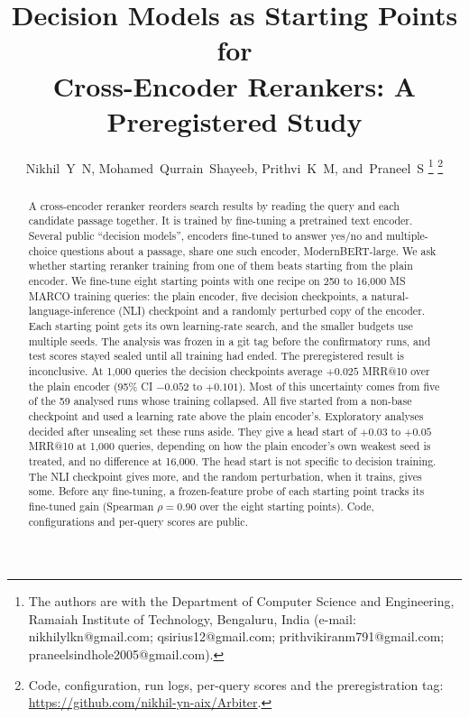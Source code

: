 \documentclass[journal]{IEEEtran}
\makeatletter
\newcommand{\ms}{MRR@10}
\makeatother
\begin{document}
\title{Decision Models as Starting Points for\\Cross-Encoder Rerankers: A Preregistered Study}

\author{Nikhil~Y~N, Mohamed~Qurrain~Shayeeb, Prithvi~K~M, and~Praneel~S%
\thanks{The authors are with the Department of Computer Science and Engineering, Ramaiah Institute of Technology, Bengaluru, India (e-mail: nikhilylkn@gmail.com; qsirius12@gmail.com; prithvikiranm791@gmail.com; praneelsindhole2005@gmail.com).}%
\thanks{Code, configuration, run logs, per-query scores and the preregistration tag: \url{https://github.com/nikhil-yn-aix/Arbiter}.}}


\maketitle

\begin{abstract}
A cross-encoder reranker reorders search results by reading the query and each candidate passage together. It is trained by fine-tuning a pretrained text encoder. Several public ``decision models'', encoders fine-tuned to answer yes/no and multiple-choice questions about a passage, share one such encoder, ModernBERT-large. We ask whether starting reranker training from one of them beats starting from the plain encoder. We fine-tune eight starting points with one recipe on 250 to 16{,}000 MS MARCO training queries: the plain encoder, five decision checkpoints, a natural-language-inference (NLI) checkpoint and a randomly perturbed copy of the encoder. Each starting point gets its own learning-rate search, and the smaller budgets use multiple seeds. The analysis was frozen in a git tag before the confirmatory runs, and test scores stayed sealed until all training had ended. The preregistered result is inconclusive. At 1{,}000 queries the decision checkpoints average $+0.025$ \ms{} over the plain encoder (95\% CI $-0.052$ to $+0.101$). Most of this uncertainty comes from five of the 59 analysed runs whose training collapsed. All five started from a non-base checkpoint and used a learning rate above the plain encoder's. Exploratory analyses decided after unsealing set these runs aside. They give a head start of $+0.03$ to $+0.05$ \ms{} at 1{,}000 queries, depending on how the plain encoder's own weakest seed is treated, and no difference at 16{,}000. The head start is not specific to decision training. The NLI checkpoint gives more, and the random perturbation, when it trains, gives some. Before any fine-tuning, a frozen-feature probe of each starting point tracks its fine-tuned gain (Spearman $\rho=0.90$ over the eight starting points). Code, configurations and per-query scores are public.
\end{abstract}
\end{document}
